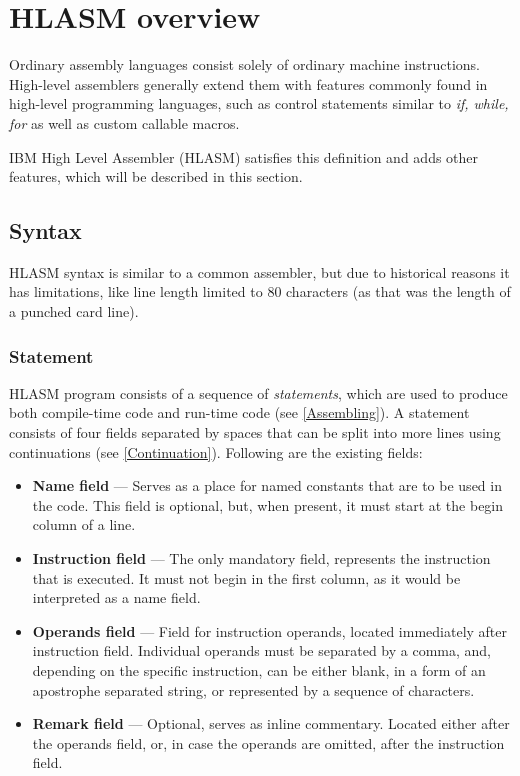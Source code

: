 \chapter{HLASM overview}
\label{hlasm}
Ordinary assembly languages consist solely of ordinary machine instructions. High-level assemblers generally extend them with features commonly found in high-level programming languages, such as control statements similar to \emph{if, while, for} as well as custom callable macros.

IBM High Level Assembler (HLASM) satisfies this definition and adds other features, which will be described in this section.

\section{Syntax}

HLASM syntax is similar to a common assembler, but due to historical reasons it has limitations, like line length limited to 80 characters (as that was the length of a punched card line).

\subsection{Statement}

HLASM program consists of a sequence of \emph{statements}, which are used to produce both compile-time code and run-time code (see \cref{Assembling}). A statement consists of four fields separated by spaces that can be split into more lines using continuations (see \cref{Continuation}). Following are the existing fields:
\begin{itemize}
	\item \textbf{Name field} --- Serves as a place for named constants that are to be used in the code. This field is optional, but, when present, it must start at the begin column of a line.
	
	\item \textbf{Instruction field} --- The only mandatory field, represents the instruction that is executed. It must not begin in the first column, as it would be interpreted as a name field.
	
	\item \textbf{Operands field} --- Field for instruction operands, located immediately after instruction field. Individual operands must be separated by a comma, and, depending on the specific instruction, can be either blank, in a form of an apostrophe separated string, or represented by a sequence of characters.
	
	\item \textbf{Remark field} --- Optional, serves as inline commentary. Located either after the operands field, or, in case the operands are omitted, after the instruction field. 
\end{itemize}

